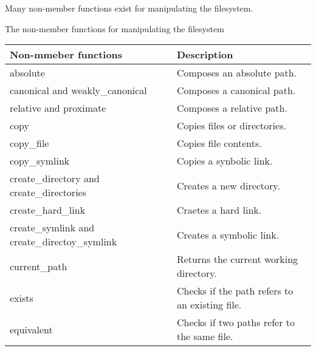 Many non-member functions exist for manipulating the filesystem.

\begin{center}
The non-member functions for manipulating the filesystem
\end{center}

\begin{longtable}[c]{|l|l|}
\hline
\textbf{Non-mmeber functions}                 & \textbf{Description}                                            \\ \hline
\endfirsthead
%
\endhead
%
absolute                                      & Composes an absolute path.                                      \\ \hline
canonical and weakly\_canonical               & Composes a canonical path.                                      \\ \hline
relative and proximate                        & Composes a relative path.                                       \\ \hline
copy                                          & Copies files or directories.                                    \\ \hline
copy\_file                                    & Copies file contents.                                           \\ \hline
copy\_symlink                                 & Copies a synbolic link.                                         \\ \hline
create\_directory and create\_directories     & Creates a new directory.                                        \\ \hline
create\_hard\_link                            & Craetes a hard link.                                            \\ \hline
create\_symlink and create\_directoy\_symlink & Creates a symbolic link.                                        \\ \hline
current\_path                                 & Returns the current working directory.                          \\ \hline
exists                                        & Checks if the path refers to an existing file.                  \\ \hline
equivalent                                    & Checks if two paths refer to the same file.                     \\ \hline

\end{longtable}
